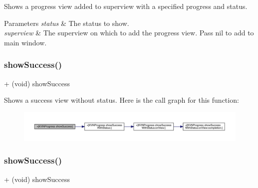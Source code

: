 Shows a progress view added to {\ttfamily superview} with a specified {\ttfamily progress} and {\ttfamily status}. 
\begin{DoxyParams}{Parameters}
{\em status} & The status to show. \\
\hline
{\em superview} & The superview on which to add the progress view. Pass {\ttfamily nil} to add to main window. \\
\hline
\end{DoxyParams}
\mbox{\label{interface_k_v_n_progress_a3b92c0b7eeebe3537ba37d7f56c5b2bb}} 
\subsubsection{\texorpdfstring{show\+Success()}{showSuccess()}\hspace{0.1cm}{\footnotesize\ttfamily [1/3]}}
{\footnotesize\ttfamily + (void) show\+Success \begin{DoxyParamCaption}{ }\end{DoxyParamCaption}}

Shows a success view without status. Here is the call graph for this function\+:\nopagebreak
\begin{figure}[H]
\begin{center}
\leavevmode
\includegraphics[width=350pt]{interface_k_v_n_progress_a3b92c0b7eeebe3537ba37d7f56c5b2bb_cgraph}
\end{center}
\end{figure}
\mbox{\label{interface_k_v_n_progress_a3b92c0b7eeebe3537ba37d7f56c5b2bb}} 
\subsubsection{\texorpdfstring{show\+Success()}{showSuccess()}\hspace{0.1cm}{\footnotesize\ttfamily [2/3]}}
{\footnotesize\ttfamily + (void) show\+Success \begin{DoxyParamCaption}{ }\end{DoxyParamCaption}}


